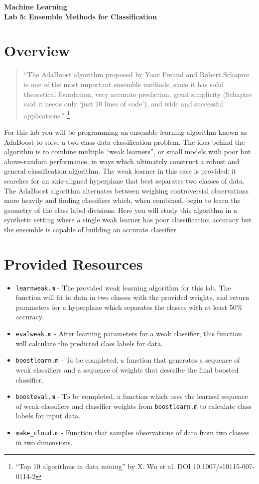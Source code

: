 \documentclass[11pt,noanswers,addpoints]{exam}
\begin{document}
{\Large{\textbf{Machine Learning}}} \\[2mm]
\textbf{\Huge{Lab 5: Ensemble Methods for Classification}}\\[2mm]

\section{Overview}

\begin{quote}
``The AdaBoost algorithm proposed by Yoav Freund and Robert Schapire is one of the 
most important ensemble methods,
since it has solid theoretical foundation, very accurate prediction, great simplicity
(Schapire said it needs only `just 10 lines of code'),
and wide and successful applications.''
\footnote{``Top 10 algorithms in data mining'' by X. Wu et al. DOI 10.1007/s10115-007-0114-2}
\end{quote}

For this lab you will be programming an ensemble learning algorithm known as AdaBoost to solve
a two-class data classification problem.
 The idea behind the algorithm is to combine multiple ``weak
learners'', or small models with poor but above-random performance, in ways which ultimately
construct a robust and general classification algorithm. The weak learner in this case is 
provided: it searches for an axis-aligned hyperplane that best separates two classes of data. 
The AdaBoost algorithm alternates between weighing controversial observations more heavily
and finding classifiers which, when combined, begin to learn the geometry of the class label divisions.
Here you will study this algorithm in a synthetic setting where a single weak learner has poor 
classification accuracy but the ensemble is capable of building an accurate classifier.

\section{Provided Resources}
\begin{itemize}
\item \texttt{learnweak.m} - The provided weak learning algorithm for this lab. The function will fit 
to data in two classes with the provided weights, and return parameters for a hyperplane which
separates the classes with at least 50\% accuracy.
\item \texttt{evalweak.m} - After learning parameters for a weak classifier, this function will calculate
the predicted class labels for data.
\item \texttt{boostlearn.m} - To be completed, a function that generates a sequence of weak classifiers
and a sequence of weights that describe the final boosted classifier.
\item \texttt{boosteval.m} - To be completed, a function which uses the learned sequence of weak classifiers
and classifier weights from \texttt{boostlearn.m} to calculate class labels for input data.
\item \texttt{make\_cloud.m} - Function that samples observations of data from two classes in two dimensions.
\end{itemize}
\end{document}
